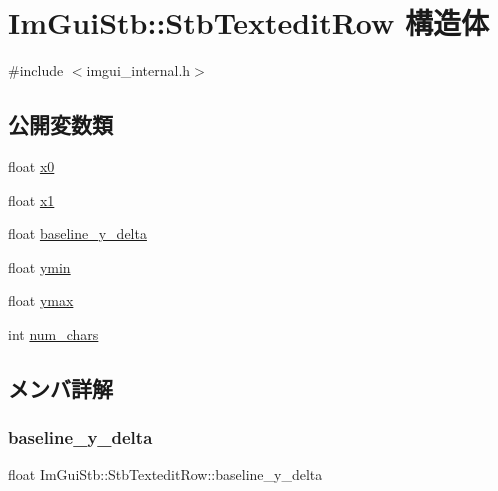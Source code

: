 \hypertarget{struct_im_gui_stb_1_1_stb_textedit_row}{}\section{Im\+Gui\+Stb\+:\+:Stb\+Textedit\+Row 構造体}
\label{struct_im_gui_stb_1_1_stb_textedit_row}


{\ttfamily \#include $<$imgui\+\_\+internal.\+h$>$}

\subsection*{公開変数類}
\begin{DoxyCompactItemize}
\item 
float \mbox{\hyperlink{struct_im_gui_stb_1_1_stb_textedit_row_a54de789c8fab0c5ad31582205b5ffc8a}{x0}}
\item 
float \mbox{\hyperlink{struct_im_gui_stb_1_1_stb_textedit_row_a53dcf8609e65440d8f16c6e531c21bc3}{x1}}
\item 
float \mbox{\hyperlink{struct_im_gui_stb_1_1_stb_textedit_row_a0a5d9561ecf2294b3341935f85b476a5}{baseline\+\_\+y\+\_\+delta}}
\item 
float \mbox{\hyperlink{struct_im_gui_stb_1_1_stb_textedit_row_a0c8be0676857e3a182ab73d1782e5da0}{ymin}}
\item 
float \mbox{\hyperlink{struct_im_gui_stb_1_1_stb_textedit_row_a24b4b9e6983914519d01335b4014a774}{ymax}}
\item 
int \mbox{\hyperlink{struct_im_gui_stb_1_1_stb_textedit_row_a7c8074c51d638753e44cb808fd5698ae}{num\+\_\+chars}}
\end{DoxyCompactItemize}


\subsection{メンバ詳解}
\mbox{\label{struct_im_gui_stb_1_1_stb_textedit_row_a0a5d9561ecf2294b3341935f85b476a5}} 
\subsubsection{\texorpdfstring{baseline\+\_\+y\+\_\+delta}{baseline\_y\_delta}}
{\footnotesize\ttfamily float Im\+Gui\+Stb\+::\+Stb\+Textedit\+Row\+::baseline\+\_\+y\+\_\+delta}

